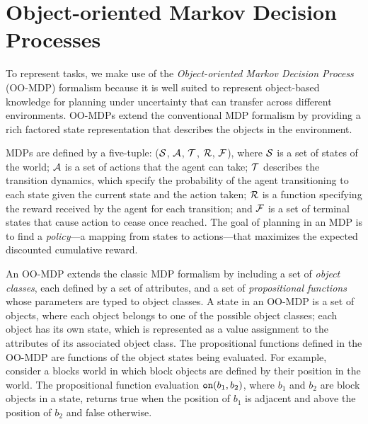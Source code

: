\documentclass[conference]{IEEEtran}
\begin{document}


\section{Object-oriented Markov Decision Processes}
To represent tasks, we make use of the {\em Object-oriented Markov Decision Process} (OO-MDP) formalism \cite{diuk08b} because it is well suited to represent object-based knowledge for planning under uncertainty that can transfer across different environments. OO-MDPs extend the conventional MDP formalism by providing a rich factored state representation that describes the objects in the environment. 

MDPs are defined by a five-tuple: (${\cal S}$, ${\cal A}$, ${\cal T}$, ${\cal R}$, ${\cal F}$), where ${\cal S}$ is a set of states of the world; ${\cal A}$ is a set of actions that the agent can take; ${\cal T}$ describes the transition dynamics, which specify the probability of the agent transitioning to each state given the current state and the action taken; ${\cal R}$ is a function specifying the reward received by the agent for each transition; and ${\cal F}$ is a set of terminal states that cause action to cease once reached. The goal of planning in an MDP is to find a {\em policy}---a mapping from states to actions---that maximizes the expected discounted cumulative reward.

An OO-MDP extends the classic MDP formalism by including a set of {\em object classes}, each defined by a set of attributes, and a set of \emph{propositional functions} whose parameters are typed to object classes. A state in an OO-MDP is a set of 
objects,
where each object belongs to one of the possible object classes; each object has its own state, which is represented as a value assignment to the attributes of its associated object class. The propositional functions defined in the OO-MDP are functions of the object states being evaluated. For example, consider a blocks world in which block objects are defined by their position in the world. The propositional function evaluation ${\tt on}(b_1, b_2)$, where $b_1$ and $b_2$ are block objects in a state, returns {\sf true} when the position of $b_1$ is adjacent and above the position of $b_2$ and {\sf false} otherwise. 
\end{document}
